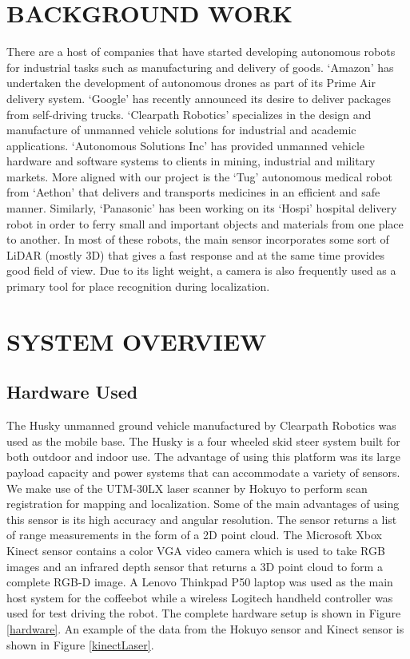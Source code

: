 \documentclass[letterpaper, 10 pt, conference]{ieeeconf}  %
\begin{document}
\section{BACKGROUND WORK}

There are a host of companies that have started developing autonomous robots for industrial tasks such as manufacturing and delivery of goods. \enquote*{Amazon} has undertaken the development of autonomous drones as part of its Prime Air delivery system. \enquote*{Google} has recently announced its desire to deliver packages from self-driving trucks. \enquote*{Clearpath Robotics} specializes in the design and manufacture of unmanned vehicle solutions for industrial and academic applications. \enquote*{Autonomous Solutions Inc} has provided unmanned vehicle hardware and software systems to clients in mining, industrial and military markets. More aligned with our project is the \enquote*{Tug} autonomous medical robot from \enquote*{Aethon} that delivers and transports medicines in an efficient and safe manner. Similarly, \enquote*{Panasonic} has been working on its \enquote*{Hospi} hospital delivery robot in order to ferry small and important objects and materials from one place to another. In most of these robots, the main sensor incorporates some sort of LiDAR (mostly 3D) that gives a fast response and at the same time provides good field of view. Due to its light weight, a camera is also frequently used as a primary tool for place recognition during localization.

\section{SYSTEM OVERVIEW}

\subsection{Hardware Used}

The Husky unmanned ground vehicle manufactured by Clearpath Robotics was used as the mobile base. The Husky is a four wheeled skid steer system built for both outdoor and indoor use. The advantage of using this platform was its large payload capacity and power systems that can accommodate a variety of sensors. We make use of the UTM-30LX laser scanner by Hokuyo to perform scan registration for mapping and localization. Some of the main advantages of using this sensor is its high accuracy and angular resolution. The sensor returns a list of range measurements in the form of a 2D point cloud. The Microsoft Xbox Kinect sensor contains a color VGA video camera which is used to take RGB images and an infrared depth sensor that returns a 3D point cloud to form a complete RGB-D image. A Lenovo Thinkpad P50 laptop was used as the main host system for the coffeebot while a wireless Logitech handheld controller was used for test driving the robot. The complete hardware setup is shown in Figure \ref{hardware}. An example of the data from the Hokuyo sensor and Kinect sensor is shown in Figure \ref{kinectLaser}.
\end{document}
